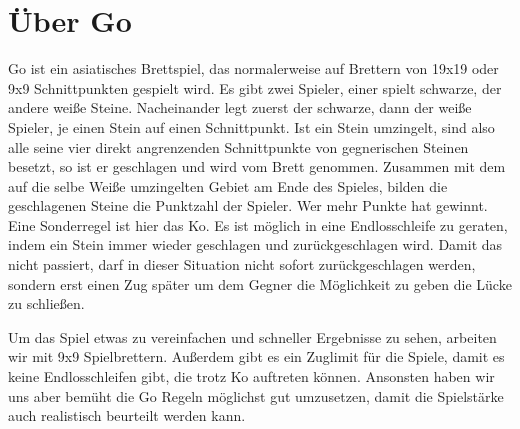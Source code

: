 \section{Über Go}
Go ist ein asiatisches Brettspiel, das normalerweise auf Brettern von 19x19 oder
9x9 Schnittpunkten gespielt wird. Es gibt zwei Spieler, einer spielt schwarze,
der andere weiße Steine. Nacheinander legt zuerst der schwarze, dann der weiße
Spieler, je einen Stein auf einen Schnittpunkt. Ist ein Stein umzingelt, sind
also alle seine vier direkt angrenzenden Schnittpunkte von gegnerischen Steinen
besetzt, so ist er geschlagen und wird vom Brett genommen. Zusammen mit dem auf
die selbe Weiße umzingelten Gebiet am Ende des Spieles, bilden die geschlagenen
Steine die Punktzahl der Spieler. Wer mehr Punkte hat gewinnt. Eine Sonderregel
ist hier das Ko. Es ist möglich in eine Endlosschleife zu geraten, indem ein
Stein immer wieder geschlagen und zurückgeschlagen wird. Damit das nicht
passiert, darf in dieser Situation nicht sofort zurückgeschlagen werden, sondern
erst einen Zug später um dem Gegner die Möglichkeit zu geben die Lücke zu
schließen. 

Um das Spiel etwas zu vereinfachen und schneller Ergebnisse zu sehen, arbeiten
wir mit 9x9 Spielbrettern. Außerdem gibt es ein Zuglimit für die Spiele, damit
es keine Endlosschleifen gibt, die trotz Ko auftreten können. Ansonsten haben
wir uns aber bemüht die Go Regeln möglichst gut umzusetzen, damit die
Spielstärke auch realistisch beurteilt werden kann.
